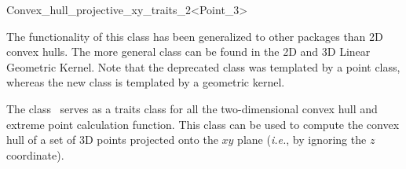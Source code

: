 
\ccAutoIndexingOff
\begin{ccRefClass}{Convex_hull_projective_xy_traits_2<Point_3>}
\ccAutoIndexingOn
{}



The functionality of this class has been generalized to other packages than 2D convex hulls.
The more general class  can be found in the 2D and 3D Linear Geometric Kernel.
Note that the deprecated class was templated by a point class, whereas the new class
is templated by a geometric kernel.

\begin{ccDeprecated}

\ccDefinition
  
The class \ccRefName\ serves as a traits class for all the two-dimensional
convex hull and extreme point calculation function.   This class can be
used to compute the convex hull of a set of 3D points projected onto the
$xy$ plane (\textit{i.e.}, by ignoring the $z$ coordinate).


\ccIsModel

%
 \\

\ccTypes

\ccAutoIndexingOff
{}
\ccThreeToTwo

\ccGlue
{}
\ccGlue
{}
\ccGlue
{}
\ccGlue
{}
\ccGlue
{}
\ccGlue
{}


\end{ccDeprecated}
\end{ccRefClass}
